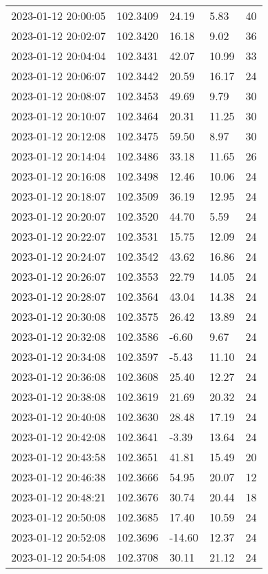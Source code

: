 \documentclass{nature_plusfigure}
\begin{document}
\begin{supplement}
\begin{center}
\begin{longtable}{lllll}
2023-01-12 20:00:05 & 102.3409 & 24.19 & 5.83 & 40 \\ 
2023-01-12 20:02:07 & 102.3420 & 16.18 & 9.02 & 36 \\ 
2023-01-12 20:04:04 & 102.3431 & 42.07 & 10.99 & 33 \\ 
2023-01-12 20:06:07 & 102.3442 & 20.59 & 16.17 & 24 \\ 
2023-01-12 20:08:07 & 102.3453 & 49.69 & 9.79 & 30 \\ 
2023-01-12 20:10:07 & 102.3464 & 20.31 & 11.25 & 30 \\ 
2023-01-12 20:12:08 & 102.3475 & 59.50 & 8.97 & 30 \\ 
2023-01-12 20:14:04 & 102.3486 & 33.18 & 11.65 & 26 \\ 
2023-01-12 20:16:08 & 102.3498 & 12.46 & 10.06 & 24 \\ 
2023-01-12 20:18:07 & 102.3509 & 36.19 & 12.95 & 24 \\ 
2023-01-12 20:20:07 & 102.3520 & 44.70 & 5.59 & 24 \\ 
2023-01-12 20:22:07 & 102.3531 & 15.75 & 12.09 & 24 \\ 
2023-01-12 20:24:07 & 102.3542 & 43.62 & 16.86 & 24 \\ 
2023-01-12 20:26:07 & 102.3553 & 22.79 & 14.05 & 24 \\ 
2023-01-12 20:28:07 & 102.3564 & 43.04 & 14.38 & 24 \\ 
2023-01-12 20:30:08 & 102.3575 & 26.42 & 13.89 & 24 \\ 
2023-01-12 20:32:08 & 102.3586 & -6.60 & 9.67 & 24 \\ 
2023-01-12 20:34:08 & 102.3597 & -5.43 & 11.10 & 24 \\ 
2023-01-12 20:36:08 & 102.3608 & 25.40 & 12.27 & 24 \\ 
2023-01-12 20:38:08 & 102.3619 & 21.69 & 20.32 & 24 \\ 
2023-01-12 20:40:08 & 102.3630 & 28.48 & 17.19 & 24 \\ 
2023-01-12 20:42:08 & 102.3641 & -3.39 & 13.64 & 24 \\ 
2023-01-12 20:43:58 & 102.3651 & 41.81 & 15.49 & 20 \\ 
2023-01-12 20:46:38 & 102.3666 & 54.95 & 20.07 & 12 \\ 
2023-01-12 20:48:21 & 102.3676 & 30.74 & 20.44 & 18 \\ 
2023-01-12 20:50:08 & 102.3685 & 17.40 & 10.59 & 24 \\ 
2023-01-12 20:52:08 & 102.3696 & -14.60 & 12.37 & 24 \\ 
2023-01-12 20:54:08 & 102.3708 & 30.11 & 21.12 & 24 \\ 

\end{longtable}
\end{center}
\end{supplement}
\end{document}
